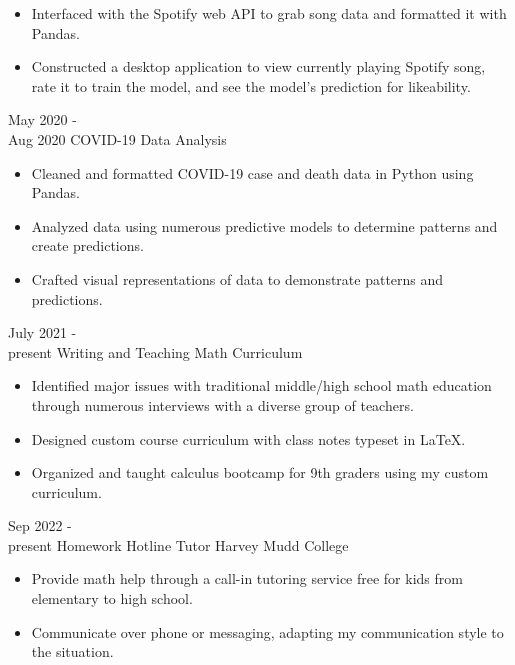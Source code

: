 \documentclass[9pt]{developercv} %
\begin{document}
\begin{entrylist}
{\begin{itemize}[noitemsep, topsep=1pt]
			\item Interfaced with the Spotify web API to grab song data and formatted it with Pandas. 
			\item Constructed a desktop application to view currently playing Spotify song, rate it to train the model, and see the model's prediction for likeability. 
		\end{itemize}}
	\entry 
		{May 2020 -\\Aug 2020}
		{COVID-19 Data Analysis}
		{}
		{\begin{itemize}[noitemsep, topsep=1pt]
			\item Cleaned and formatted COVID-19 case and death data in Python using Pandas.
			\item Analyzed data using numerous predictive models to determine patterns and create predictions. 
			\item Crafted visual representations of data to demonstrate patterns and predictions. 
		\end{itemize}}
	\entry
		{July 2021 -\\present}
		{Writing and Teaching Math Curriculum}
		{}
		{\begin{itemize}[noitemsep, topsep=1pt]
			\item Identified major issues with traditional middle/high school math education through numerous
			interviews with a diverse group of teachers.
			\item Designed custom course curriculum with class notes typeset in LaTeX.
			\item Organized and taught calculus bootcamp for 9th graders using my custom curriculum.
		\end{itemize}}
\end{entrylist}

\begin{entrylist}
	\entry 
		{Sep 2022 -\\present} 
		{Homework Hotline Tutor}
		{Harvey Mudd College}
		{\begin{itemize}[noitemsep, topsep=1pt]
			\item Provide math help through a call-in tutoring service free for kids from elementary to high school.
			\item Communicate over phone or messaging, adapting my communication style to the situation.
		\end{itemize}}
\end{entrylist}
\end{document}
